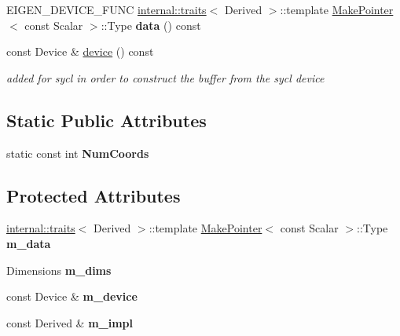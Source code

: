 \begin{DoxyCompactItemize}
E\+I\+G\+E\+N\+\_\+\+D\+E\+V\+I\+C\+E\+\_\+\+F\+U\+NC \hyperlink{struct_eigen_1_1internal_1_1traits}{internal\+::traits}$<$ Derived $>$\+::template \hyperlink{struct_eigen_1_1_make_pointer}{Make\+Pointer}$<$ const Scalar $>$\+::Type {\bfseries data} () const
\item 
\mbox{\label{struct_eigen_1_1_tensor_evaluator_3_01const_01_derived_00_01_device_01_4_ac5b59eb35ea904aca2c6e6fa6e719ff4}} 
const Device \& \hyperlink{struct_eigen_1_1_tensor_evaluator_3_01const_01_derived_00_01_device_01_4_ac5b59eb35ea904aca2c6e6fa6e719ff4}{device} () const
\begin{DoxyCompactList}\small\item\em added for sycl in order to construct the buffer from the sycl device \end{DoxyCompactList}\end{DoxyCompactItemize}
\subsection*{Static Public Attributes}
\begin{DoxyCompactItemize}
\item 
static const int {\bfseries Num\+Coords}
\end{DoxyCompactItemize}
\subsection*{Protected Attributes}
\begin{DoxyCompactItemize}
\item 
\mbox{\label{struct_eigen_1_1_tensor_evaluator_3_01const_01_derived_00_01_device_01_4_a16f0a6892d66c5aac06f4fb9ceb4389b}} 
\hyperlink{struct_eigen_1_1internal_1_1traits}{internal\+::traits}$<$ Derived $>$\+::template \hyperlink{struct_eigen_1_1_make_pointer}{Make\+Pointer}$<$ const Scalar $>$\+::Type {\bfseries m\+\_\+data}
\item 
\mbox{\label{struct_eigen_1_1_tensor_evaluator_3_01const_01_derived_00_01_device_01_4_ade9797f3ef6792e8f544dfceda9c8d00}} 
Dimensions {\bfseries m\+\_\+dims}
\item 
\mbox{\label{struct_eigen_1_1_tensor_evaluator_3_01const_01_derived_00_01_device_01_4_a4869ce49ce7ec5a42d1fc23dc9c39bc4}} 
const Device \& {\bfseries m\+\_\+device}
\item 
\mbox{\label{struct_eigen_1_1_tensor_evaluator_3_01const_01_derived_00_01_device_01_4_a0685cd9fcf2747854b44e66153bbcc28}} 
const Derived \& {\bfseries m\+\_\+impl}
\end{DoxyCompactItemize}


